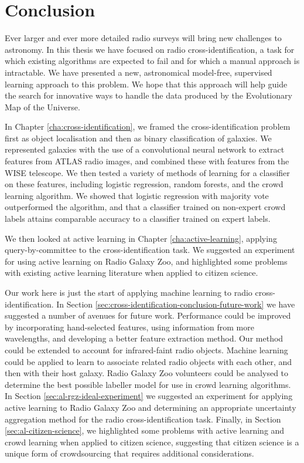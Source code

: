 
\chapter{Conclusion}
\label{cha:conclusion}

    Ever larger and ever more detailed radio surveys will bring new challenges
    to astronomy. In this thesis we have focused on radio cross-identification,
    a task for which existing algorithms are expected to fail and for which a
    manual approach is intractable. We have presented a new, astronomical
    model-free, supervised learning approach to this problem. We hope that this
    approach will help guide the search for innovative ways to handle the data
    produced by the Evolutionary Map of the Universe.

    In Chapter \ref{cha:cross-identification}, we framed the
    cross-identification problem first as object localisation and then as binary
    classification of galaxies. We represented galaxies with the use of a
    convolutional neural network to extract features from ATLAS radio images,
    and combined these with features from the WISE telescope. We then tested a
    variety of methods of learning for a classifier on these features, including
    logistic regression, random forests, and the \citet{raykar10} crowd learning
    algorithm. We showed that logistic regression with majority vote
    outperformed the \citeauthor{raykar10} algorithm, and that a classifier
    trained on non-expert crowd labels attains comparable accuracy to a
    classifier trained on expert labels.

    We then looked at active learning in Chapter \ref{cha:active-learning},
    applying query-by-committee to the cross-identification task. We suggested
    an experiment for using active learning on Radio Galaxy Zoo, and highlighted
    some problems with existing active learning literature when applied to
    citizen science.

    Our work here is just the start of applying machine learning to radio
    cross-identification. In Section
    \ref{sec:cross-identification-conclusion-future-work} we have suggested a
    number of avenues for future work. Performance could be improved by
    incorporating hand-selected features, using information from more
    wavelengths, and developing a better feature extraction method. Our method
    could be extended to account for infrared-faint radio objects. Machine
    learning could be applied to learn to associate related radio objects with
    each other, and then with their host galaxy. Radio Galaxy Zoo volunteers
    could be analysed to determine the best possible labeller model for use in
    crowd learning algorithms. In Section \ref{sec:al-rgz-ideal-experiment} we
    suggested an experiment for applying active learning to Radio Galaxy Zoo and
    determining an appropriate uncertainty aggregation method for the radio
    cross-identification task. Finally, in Section \ref{sec:al-citizen-science},
    we highlighted some problems with active learning and crowd learning when
    applied to citizen science, suggesting that citizen science is a unique form
    of crowdsourcing that requires additional considerations.
